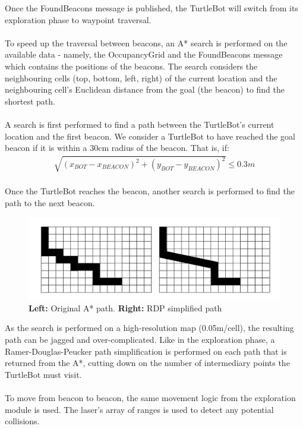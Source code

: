 \documentclass[titlepage,12pt,a4paper]{article}
\begin{document}
Once the FoundBeacons message is published, the TurtleBot will switch from its exploration phase to waypoint traversal.\\
\\
To speed up the traversal between beacons, an A* search is performed on the available data - namely, the OccupancyGrid and the FoundBeacons message which contains the positions of the beacons. The search considers the neighbouring cells (top, bottom, left, right) of the current location and the neighbouring cell's Euclidean distance from the goal (the beacon) to find the shortest path. \\
\\
A search is first performed to find a path between the TurtleBot's current location and the first beacon. We consider a TurtleBot to have reached the goal beacon if it is within a 30cm radius of the beacon. That is, if: \\

\begin{align*}
	\sqrt{(x_{BOT} - x_{BEACON})^2 + (y_{BOT} - y_{BEACON})^2} \leq 0.3m \\
\end{align*}

\noindent
Once the TurtleBot reaches the beacon, another search is performed to find the path to the next beacon.\\

\begin{figure}[h]
  	\begin{center}
	\includegraphics[scale=0.27]{rdpExample.jpg}
	\caption{\textbf{Left:} Original A* path. \textbf{Right:} RDP simplified path}
	\end{center}
\end{figure}

\noindent
As the search is performed on a high-resolution map (0.05m/cell), the resulting path can be jagged and over-complicated. Like in the exploration phase, a Ramer-Douglas-Peucker path simplification is performed on each path that is returned from the A*, cutting down on the number of intermediary points the TurtleBot must visit.\\
\\
To move from beacon to beacon, the same movement logic from the exploration module is used. The laser's array of ranges is used to detect any potential collisions.\\
\end{document}
